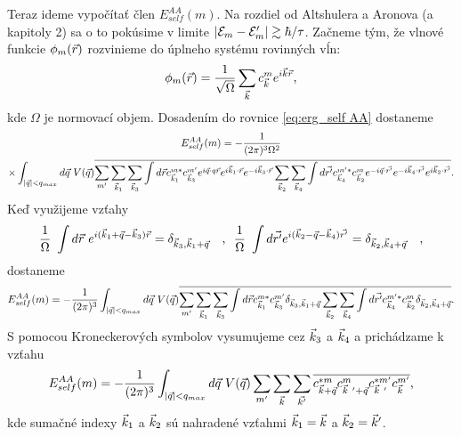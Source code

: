 Teraz ideme vypočítať člen $E_{self}^{AA}(m)$. Na rozdiel od Altshulera a Aronova (a kapitoly 2) sa o to pokúsime v limite $|\mathcal{E}_m - \mathcal{E}_m'| \gtrsim \hbar/\tau$.
Začneme tým, že vlnové funkcie $\phi_m(\vec{r})$ rozvinieme do úplneho systému rovinných vĺn:
\begin{align}
\label{eq:05phi}
\phi_m(\vec{r}) = \frac{1}{\sqrt{\Omega}}\sum_{\vec{k}}c_{\vec{k}}^me^{i\vec{k}\vec{r}}\text{,}
\end{align}
kde $\Omega$ je normovací objem. Dosadením do rovnice \eqref{eq:erg_self AA} dostaneme
\begin{multline}
E_{self}^{AA}(m)=  - \frac{1}{(2\pi)^3\Omega^2}     \\
\times  \int_{|\vec{q}| < q_{max}} d\vec{q}\ V(\vec{q})\overline{ \sum_{m'} \sum_{\vec{k}_1} \sum_{\vec{k}_3}\int d\vec{r} c^{m*}_{\vec{k}_1}c^{m'}_{\vec{k}_3}e^{i\vec{q}\cdot q\vec{r}}e^{i\vec{k}_1\cdot \vec{r}}e^{-i\vec{k}_3\cdot \vec{r}} \sum_{\vec{k}_2}\sum_{\vec{k}_4}\int d\vec{r'} c^{m'*}_{\vec{k}_4}c^{m}_{\vec{k}_2}e^{-i\vec{q}\cdot \vec{r'}}e^{-i\vec{k}_4\cdot \vec{r'}}e^{i\vec{k}_2\cdot \vec{r'}}} \text{.}
\end{multline}
Keď využijeme vzťahy
\begin{equation}
\frac{1}{\Omega}\ \int d\vr\ e^{i(\vk_1+\vq-\vk_3)\vr}=\delta_{\vk_3,\vk_1+\vq}
\  \   \  \text{,}
\ \
\frac{1}{\Omega} \ \int d\vrp e^{i(\vk_2-\vq-\vk_4)\vrp}=\delta_{\vk_2,\vk_4+\vq}
\ \ \  \text{,}
\end{equation}
dostaneme
\begin{equation}
E_{self}^{AA}(m) = - \frac{1}{(2\pi)^3} \int_{|\vec{q}| < q_{max}} d\vec{q}\ V(\vec{q})\overline{ \sum_{m'} \sum_{\vec{k}_1} \sum_{\vec{k}_3}\int d\vec{r} c^{m*}_{\vec{k}_1}c^{m'}_{\vec{k}_3}\delta_{\vec{k}_3,\vec{k}_1+\vec{q}} \sum_{\vec{k}_2}\sum_{\vec{k}_4}\int d\vec{r'} c^{m'*}_{\vec{k}_4}c^{m}_{\vec{k}_2}\delta_{\vec{k}_2,\vec{k}_4+\vec{q}}} \text{.}
\end{equation}
S pomocou Kroneckerových symbolov vysumujeme cez $\vec{k}_3$ a $\vec{k}_4$ a prichádzame k vzťahu
\begin{align}
E_{self}^{AA}(m)= - \frac{1}{(2\pi)^3}\int_{|\vq| < q_{max}} d\vq\ V(\vq) \sum_{m'}\sum_{\vk}\sum_{\vkp}\overline{c^{*m}_{\vk+\vq}c^{m}_{\vk\ '+\vq}c^{*m'}_{\vk\ '}c^{m'}_{\vk}}\text{,}
\end{align}
kde sumačné indexy $\vec{k}_1$ a $\vec{k}_2$ sú nahradené vzťahmi $\vec{k}_1=\vec{k}$ a $\vec{k}_2=\vec{k}'$.

